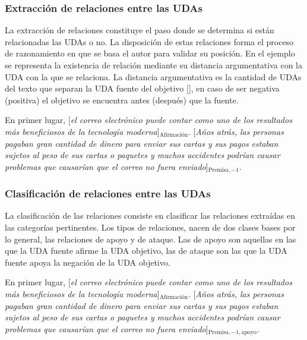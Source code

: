 \subsubsection{Extracción de relaciones entre las UDAs}

La extracción de relaciones constituye el paso donde se determina si están relacionadas las UDAs o no. 
La disposición de estas relaciones forma el proceso de razonamiento en que se basa el autor para validar 
su posición. En el ejemplo se representa la existencia de relación mediante su distancia argumentativa con 
la UDA con la que se relaciona. La distancia argumentativa es la cantidad de UDAs del texto que separan la 
UDA fuente del objetivo [\cite{galassi2021deep}], en caso de ser negativa (positiva) el objetivo se encuentra 
antes (después) que la fuente.

\begin{adjustwidth}{25pt}{25pt}
    En primer lugar, [\emph{el correo electrónico puede contar como uno de los resultados
    más beneficiosos de la tecnología moderna}]$_{\mathrm{Afirmación}}$. [\emph{Años atrás, las personas pagaban gran cantidad de dinero para 
    enviar sus cartas y sus pagos estaban sujetos al peso de sus cartas o paquetes y muchos accidentes podrían 
    causar problemas que causarían que el correo no fuera enviado}]$_{\mathrm{Premisa, -1}}$.
\end{adjustwidth}

\subsubsection{Clasificación de relaciones entre las UDAs}

La clasificación de las relaciones consiste en clasificar las relaciones extraídas en las categorías pertinentes.
Los tipos de relaciones, nacen de dos clases bases por lo general, las relaciones de apoyo y de ataque.
Las de apoyo son aquellas en las que la UDA fuente afirme la UDA objetivo, las de ataque son 
las que la UDA fuente apoya la negación de la UDA objetivo.

\begin{adjustwidth}{25pt}{25pt}
    En primer lugar, [\emph{el correo electrónico puede contar como uno de los resultados
    más beneficiosos de la tecnología moderna}]$_{\mathrm{Afirmación}}$. [\emph{Años atrás, las personas pagaban gran cantidad de dinero para 
    enviar sus cartas y sus pagos estaban sujetos al peso de sus cartas o paquetes y muchos accidentes podrían 
    causar problemas que causarían que el correo no fuera enviado}]$_{\mathrm{Premisa, -1, apoyo}}$.
\end{adjustwidth}


